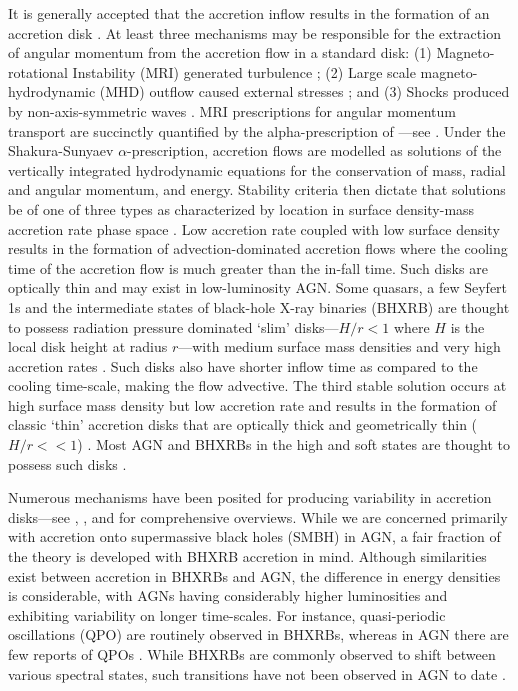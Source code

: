 \documentclass[a4paper,fleqn,usenatbib]{mnras}
\begin{document}
It is generally accepted that the accretion inflow results in the formation of an accretion disk \citep*{KoratkarBlaes99,PringleARAA}. At least three mechanisms may be responsible for the extraction of angular momentum from the accretion flow in a standard disk: (1) Magneto-rotational Instability (MRI) generated turbulence \citep*{BHI,BHRev}; (2) Large scale magneto-hydrodynamic (MHD) outflow caused external stresses \citep*{BlandfordPayne82}; and (3) Shocks produced by non-axis-symmetric waves \citep{FragileBlaes08}. MRI prescriptions for angular momentum transport are succinctly quantified by the alpha-prescription of \citet{ShakuraSunyaev73}---see \citet{BalbusPapaloizou99}. Under the Shakura-Sunyaev $\alpha$-prescription, accretion flows are modelled as solutions of the vertically integrated hydrodynamic equations for the conservation of mass, radial and angular momentum, and energy. Stability criteria then dictate that solutions be of one of three types as characterized by location in surface density-mass accretion rate phase space \citep{BlaesAccretion}. Low accretion rate coupled with low surface density results in the formation of advection-dominated accretion flows \citep{NarayanYi94,ChenAbramowicz95} where the cooling time of the accretion flow is much greater than the in-fall time. Such disks are optically thin and may exist in low-luminosity AGN. Some quasars, a few Seyfert 1s and the intermediate states of black-hole X-ray binaries (BHXRB) are thought to possess radiation pressure dominated `slim' disks---$H/r < 1$ where $H$ is the local disk height at radius $r$---with medium surface mass densities and very high accretion rates \citep{Abramowicz88}. Such disks also have shorter inflow time as compared to the cooling time-scale, making the flow advective. The third stable solution occurs at high surface mass density but low accretion rate and results in the formation of classic `thin' accretion disks that are optically thick and geometrically thin ($H/r << 1$) \citep*{ShakuraSunyaev73,FKR}. Most AGN and BHXRBs in the high and soft states are thought to possess such disks \citep{BlaesAccretion}.

Numerous mechanisms have been posited for producing variability in accretion disks---see \citet{DoneAccretion}, \citet{MaccaroneAccretion}, and \citet{UttleyAccretion} for comprehensive overviews. While we are concerned primarily with accretion onto supermassive black holes (SMBH) in AGN, a fair fraction of the theory is developed with BHXRB accretion in mind. Although similarities exist between accretion in BHXRBs and AGN, the difference in energy densities is considerable, with AGNs having considerably higher luminosities and exhibiting variability on longer time-scales. For instance, quasi-periodic oscillations (QPO) are routinely observed in BHXRBs, whereas in AGN there are few reports of QPOs \citep{GierlinskiQPO,Andrae13,GrindleyQPO}. While BHXRBs are commonly observed to shift between various spectral states, such transitions have not been observed in AGN to date \citep{Kelly11}.
\end{document}
